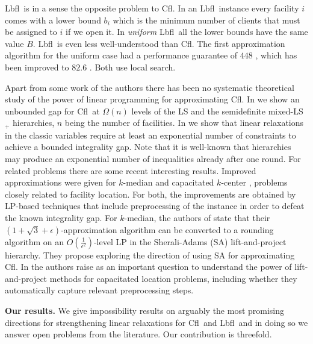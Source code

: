 \documentclass[11pt]{article}
\newcommand{\lbfl}{{\sc Lbfl}}
\newcommand{\cfl}{{\sc Cfl}}
\begin{document}
 \lbfl\ is in a sense the opposite problem to \cfl. 
 In an \lbfl\ instance   every facility $i$ comes with a  lower
bound $b_i$ 
which is the minimum number of clients that must be assigned
 to $i$  if we open it. In {\em uniform} \lbfl\ all the lower bounds
have the same value $B.$  \lbfl\ is even less well-understood than \cfl. 
 The first approximation algorithm for the uniform case 
  had  a performance guarantee of
$448$ \cite{Svitkina08}, which has been  improved  to $82.6 $ \cite{AhmadianS12}. 
Both use local search.




Apart from some  work of the authors \cite{KolliopoulosM13,KolliopoulosM14b}
there has been no systematic theoretical  study of the power of linear programming
for approximating \cfl.  
In \cite{KolliopoulosM13} we show an unbounded gap for \cfl\ at $\Omega(n)$ levels
of the LS and the semidefinite mixed-LS$_{+}$ hierarchies, $n$ being
the number of facilities.  In  
\cite{KolliopoulosM14b} we show that linear relaxations in the classic
variables require at least an exponential number of constraints to
achieve a bounded integrality gap. Note that it is well-known that hierarchies
may produce an exponential number of inequalities already after one
round. 
 For related problems there are  some recent interesting results. 
Improved  approximations  were given  for
$k$-median   \cite{LiS13}      and   capacitated   $k$-center
\cite{CyganHK12,AnBS13},  problems closely  related to
facility location.  For both, the improvements are obtained 
by LP-based techniques
that  include preprocessing  of the  instance in  order to  defeat the
known integrality gap. For $k$-median, the authors of \cite{LiS13}
state that their 
$(1+\sqrt{3} + \epsilon)$-approximation algorithm   can
be converted  to a  rounding algorithm on an 
 $O(\frac{1}{\epsilon^2})$-level LP  in the Sherali-Adams (SA)
lift-and-project hierarchy. 
They propose exploring the  direction of using 
SA  for approximating  \cfl.  In \cite{AnBS13}
the authors raise as an important question  to understand  the
power  of lift-and-project methods  for capacitated  location
problems, including  whether they automatically capture relevant 
preprocessing steps. 



\vspace*{0.3cm}
\noindent
{\bf Our results.}
We give impossibility  results on arguably the most promising 
directions for   strengthening
linear relaxations for \cfl\ and \lbfl\  and in doing so we answer  open
problems from the literature.    Our contribution is threefold. 
\end{document}
